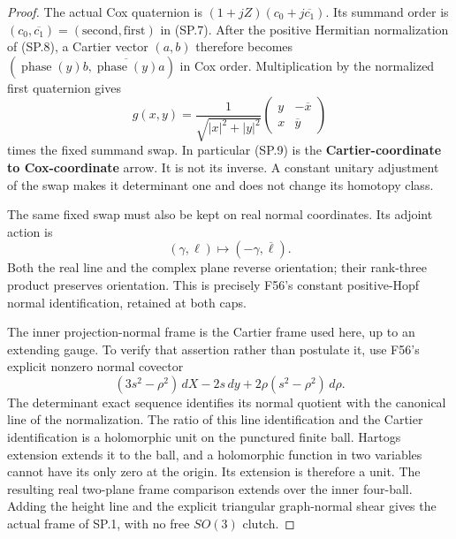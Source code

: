 \begin{proof}
The actual Cox quaternion is
\((1+jZ)(c_0+j\overline{c_1})\). Its summand order is
\((c_0,\overline{c_1})=(\text{second},\text{first})\) in
(SP.7). After the positive Hermitian normalization of (SP.8), a
Cartier vector \((a,b)\) therefore becomes
\((\operatorname{phase}(y)b,\overline{\operatorname{phase}(y)}a)\)
in Cox order. Multiplication by the normalized first quaternion gives
\[
 g(x,y)=\frac1{\sqrt{|x|^2+|y|^2}}
       \begin{pmatrix}y&-\overline x\\x&\overline y\end{pmatrix}
                                                               \tag{SP.9}
\]
times the fixed summand swap. In particular (SP.9) is the
\textbf{Cartier-coordinate to Cox-coordinate} arrow. It is not its
inverse. A constant unitary adjustment of the swap makes it
determinant one and does not change its homotopy class.

The same fixed swap must also be kept on real normal coordinates.
Its adjoint action is
\[
                  (\gamma,\ell)\longmapsto
                           (-\gamma,\overline\ell).       \tag{SP.10}
\]
Both the real line and the complex plane reverse orientation;
their rank-three product preserves orientation. This is precisely
F56's constant positive-Hopf normal identification, retained at both
caps.

The inner projection-normal frame is the Cartier frame used here,
up to an extending gauge. To verify that assertion rather than
postulate it, use F56's explicit nonzero normal covector
\[
       (3s^2-\rho^2)\,dX-2s\,dy
                          +2\rho(s^2-\rho^2)\,d\rho .     \tag{SP.11}
\]
The determinant exact sequence identifies its normal quotient with
the canonical line of the normalization. The ratio of this line
identification and the Cartier identification is a holomorphic unit
on the punctured finite ball. Hartogs extension extends it to the
ball, and a holomorphic function in two variables cannot have its
only zero at the origin. Its extension is therefore a unit. The
resulting real two-plane frame comparison extends over the inner
four-ball. Adding the height line and the explicit triangular
graph-normal shear gives the actual frame of SP.1, with no free
\(SO(3)\) clutch.


\end{proof}
